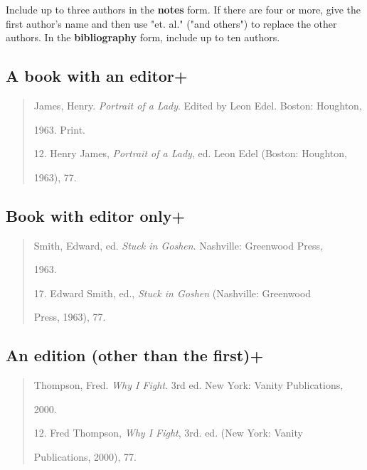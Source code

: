  Include up to three authors in the \textbf{notes} form. If there are four or more, give the first author's name and then use "et. al." ("and others") to replace the other authors. In the \textbf{bibliography} form, include up to ten authors.

\subsection{A book with an editor+}
\begin{quote}
James, Henry. \emph{Portrait of a Lady}. Edited by Leon Edel. Boston: Houghton,

\hspace{.4in}1963. Print.
\medskip

\hspace{.4in}12. Henry James, \emph{Portrait of a Lady}, ed. Leon Edel (Boston: Houghton,

1963), 77.
\end{quote}

\subsection{Book with editor only+}
\begin{quote}
Smith, Edward, ed. \emph{Stuck in Goshen}. Nashville: Greenwood Press,

\hspace{.4in}1963.
\medskip

\hspace{.4in}17. Edward Smith, ed., \emph{Stuck in Goshen} (Nashville: Greenwood 

Press, 1963), 77.
\end{quote}


\subsection{An edition (other than the first)+}
\begin{quote}
Thompson, Fred. \emph{Why I Fight}. 3rd ed. New York: Vanity Publications,

\hspace{.4in}2000.

\medskip

\hspace{.4in}12. Fred Thompson, \emph{Why I Fight}, 3rd. ed. (New York: Vanity 

Publications, 2000), 77.
\end{quote}

